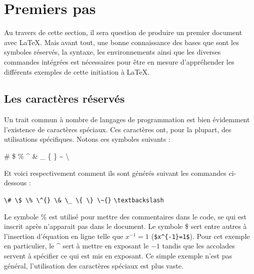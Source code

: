 \section*{Premiers pas}
Au travers de cette section, il sera question de produire un premier document avec \LaTeX. Mais avant tout, une bonne connaissance des bases que sont les symboles réservés, la syntaxe, les environnements ainsi que les diverses commandes intégrées est nécessaires pour être en mesure d'appréhender les différents exemples de cette initiation à \LaTeX.
%	
\subsection*{Les caractères réservés}
Un trait commun à nombre de langages de programmation est bien évidemment l'existence de caractères spéciaux. Ces caractères ont, pour la plupart, des utilisations spécifiques. Notons ces symboles suivants :
%	
\begin{center}
	\# \$ \% \^{} \& \_ \{ \} \~{}  \textbackslash
\end{center}
%
\par Et voici respectivement comment ils sont générés suivant les commandes ci-dessous :
\begin{flushleft}\label{lst:Caratères réservés}
	\verb|\# \$ \% \^{} \& \_ \{ \} \~{}|
	\verb|\textbackslash|
\end{flushleft}
%
Le symbole \% est utilisé pour mettre des commentaires dans le code, se qui est inscrit après n'apparait pas dans le document. Le symbole \$ sert entre autres à l'insertion d'équation en ligne telle que $x^{-1}=1$ (\verb|$x^{-1}=1$|). Pour cet exemple en particulier, le \^{} sert à mettre en exposant le $-1$ tandis que les accolades servent à spécifier ce qui est mis en exposant. Ce simple exemple n'est pas général, l'utilisation des caractères spéciaux est plus vaste.
%
